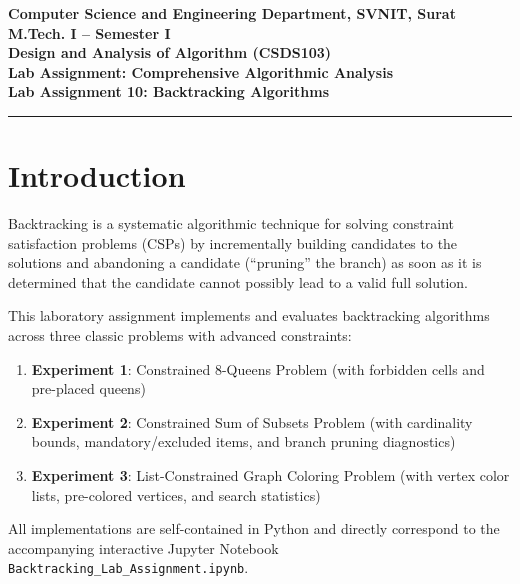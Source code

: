 \documentclass[12pt]{article}
\begin{document}

\begin{center}
\textbf{Computer Science and Engineering Department, SVNIT, Surat}\\
\textbf{M.Tech. I -- Semester I}\\
\textbf{Design and Analysis of Algorithm (CSDS103)}\\
\textbf{Lab Assignment: Comprehensive Algorithmic Analysis}\\
\textbf{Lab Assignment 10: Backtracking Algorithms}
\end{center}
\vspace{-4pt}
\hrule
\vspace{4pt}

\vspace{0.3cm}

\section{Introduction}
Backtracking is a systematic algorithmic technique for solving constraint satisfaction problems (CSPs) by incrementally building candidates to the solutions and abandoning a candidate (``pruning'' the branch) as soon as it is determined that the candidate cannot possibly lead to a valid full solution.

This laboratory assignment implements and evaluates backtracking algorithms across three classic problems with advanced constraints:
\begin{enumerate}
    \item \textbf{Experiment 1}: Constrained 8-Queens Problem (with forbidden cells and pre-placed queens)
    \item \textbf{Experiment 2}: Constrained Sum of Subsets Problem (with cardinality bounds, mandatory/excluded items, and branch pruning diagnostics)
    \item \textbf{Experiment 3}: List-Constrained Graph Coloring Problem (with vertex color lists, pre-colored vertices, and search statistics)
\end{enumerate}

All implementations are self-contained in Python and directly correspond to the accompanying interactive Jupyter Notebook \texttt{Backtracking\_Lab\_Assignment.ipynb}.

\end{document}
